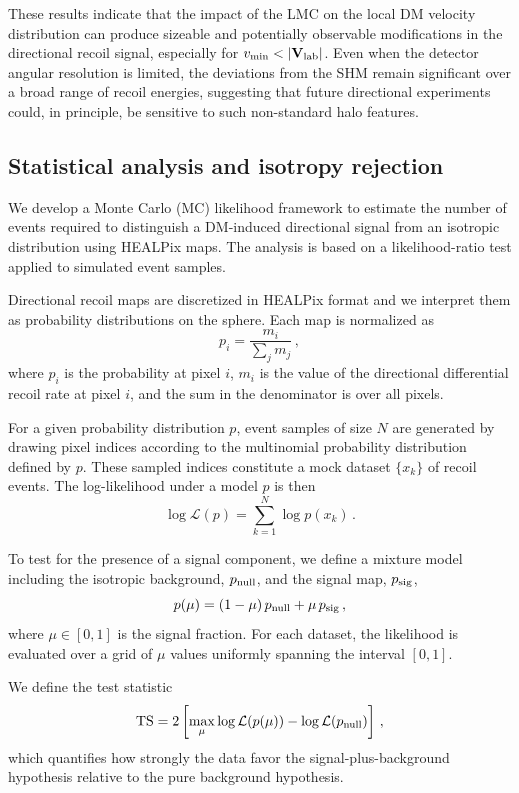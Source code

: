 \documentclass[a4paper,11pt]{article}
\begin{document}
These results indicate that the impact of the LMC on the local DM velocity distribution can produce sizeable and potentially observable modifications in the directional recoil signal, especially for $v_{\rm min}<|{\bf V}_{\rm lab}|$. Even when the detector angular resolution is limited, the deviations from the SHM remain significant over a broad range of recoil energies, suggesting that future directional experiments could, in principle, be sensitive to such non-standard halo features.



\subsection{Statistical analysis and isotropy rejection}
\label{sec:statistical_analysis}



We develop a Monte Carlo (MC) likelihood framework to estimate the number of  events required to  distinguish a DM-induced directional signal from an isotropic distribution using HEALPix  maps. The analysis is based on a likelihood-ratio test applied to simulated event samples.

Directional recoil maps are discretized in HEALPix format and we interpret them as probability distributions on the sphere. Each map is normalized as
\[
p_i = \frac{m_i}{\sum_j m_j}\,,
\]
%
where $p_i$ is the probability at pixel $i$, \(m_i\) is the value of the directional differential recoil rate at pixel \(i\), and the sum in the denominator is over all pixels.


For a given probability distribution \(p\), event samples of size $N$ are generated by drawing pixel indices according to the multinomial probability distribution defined by \(p\). These sampled indices constitute a mock dataset \(\{x_k\}\) of recoil events. The log-likelihood under a model \(p\) is then
\[
\log \mathcal{L}(p)
=
\sum_{k=1}^{N} \log p(x_k)\, .
\]

To test for the presence of a signal component, we define a mixture model including the isotropic background, \(p_{\rm null}\), and the signal map, \(p_{\rm sig}\),
\[
p(\mu)
=
(1-\mu)\,p_{\rm null}
+
\mu\, p_{\rm sig}\, ,
\]
where \(\mu \in [0,1]\) is the signal fraction. For each  dataset, the likelihood is evaluated over a grid of \(\mu\) values uniformly spanning the interval \([0,1]\).



We define the test statistic 
\[
{\rm TS}=2\left[\max_{\mu}\log \mathcal{L}(p(\mu))- \log \mathcal{L}(p_{\rm null})\right]\,,
\]
which quantifies how strongly the data favor the signal-plus-background hypothesis relative to the pure background hypothesis.
\end{document}
